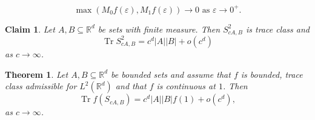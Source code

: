\documentclass[10pt,a4paper]{amsart}
\newtheorem{theorem}{Theorem}
\newtheorem{claim}{Claim}
\newcommand{\R}{\mathbb{R}}
\newcommand{\eps}{\varepsilon}
\begin{document}
\begin{equation}\label{cont at 0}
\max(M_0f(\eps), M_1f(\eps))\to 0 \text{ as } \eps \to 0^+.
\end{equation}

\begin{claim}\label{the trivial claim}
Let $A, B \subseteq \R^d$ be sets with finite measure. Then $S_{cA,B}^2$ is trace class and 
\[
\operatorname{Tr}S_{cA,B}^2 = c^d |A||B| + o(c^d) 
\]
as $c\to \infty$.
\end{claim}

\begin{theorem}\label{one term bounded}
Let $A, B \subseteq \R^d$ be bounded sets and assume that $f$ is bounded, trace class admissible for $L^2(\R^d)$ and that $f$ is continuous at $1$. Then 
\[
\operatorname{Tr} f(S_{cA, B}) = c^d|A||B| f(1) + o(c^{d}),
\]
as $c\to \infty$.
\end{theorem}
\end{document}

